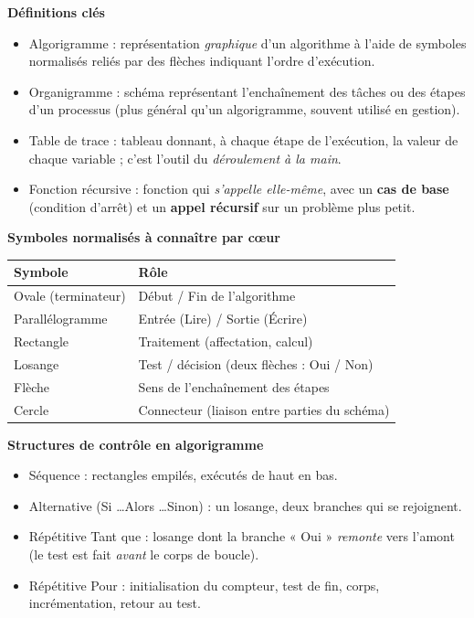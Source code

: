 \documentclass[11pt]{article}
\newcommand{\cle}[1]{{\popxbold\color{popdark}#1}}
\begin{document}
\begin{bilan}
\textbf{Définitions clés}
\begin{itemize}
  \item \cle{Algorigramme} : représentation \emph{graphique} d'un algorithme à l'aide de symboles normalisés reliés par des flèches indiquant l'ordre d'exécution.
  \item \cle{Organigramme} : schéma représentant l'enchaînement des tâches ou des étapes d'un processus (plus général qu'un algorigramme, souvent utilisé en gestion).
  \item \cle{Table de trace} : tableau donnant, à chaque étape de l'exécution, la valeur de chaque variable ; c'est l'outil du \emph{déroulement à la main}.
  \item \cle{Fonction récursive} : fonction qui \emph{s'appelle elle-même}, avec un \textbf{cas de base} (condition d'arrêt) et un \textbf{appel récursif} sur un problème plus petit.
\end{itemize}

\textbf{Symboles normalisés à connaître par cœur}
\begin{center}
\begin{tabularx}{\linewidth}{|l|X|}
\hline
\rowcolor{popblueL} \textbf{Symbole} & \textbf{Rôle} \\
\hline
Ovale (terminateur) & Début / Fin de l'algorithme \\
\hline
Parallélogramme & Entrée (Lire) / Sortie (Écrire) \\
\hline
Rectangle & Traitement (affectation, calcul) \\
\hline
Losange & Test / décision (deux flèches : Oui / Non) \\
\hline
Flèche & Sens de l'enchaînement des étapes \\
\hline
Cercle & Connecteur (liaison entre parties du schéma) \\
\hline
\end{tabularx}
\end{center}

\textbf{Structures de contrôle en algorigramme}
\begin{itemize}
  \item \cle{Séquence} : rectangles empilés, exécutés de haut en bas.
  \item \cle{Alternative} (Si \dots Alors \dots Sinon) : un losange, deux branches qui se rejoignent.
  \item \cle{Répétitive Tant que} : losange dont la branche « Oui » \emph{remonte} vers l'amont (le test est fait \emph{avant} le corps de boucle).
  \item \cle{Répétitive Pour} : initialisation du compteur, test de fin, corps, incrémentation, retour au test.
\end{itemize}


\end{bilan}
\end{document}
